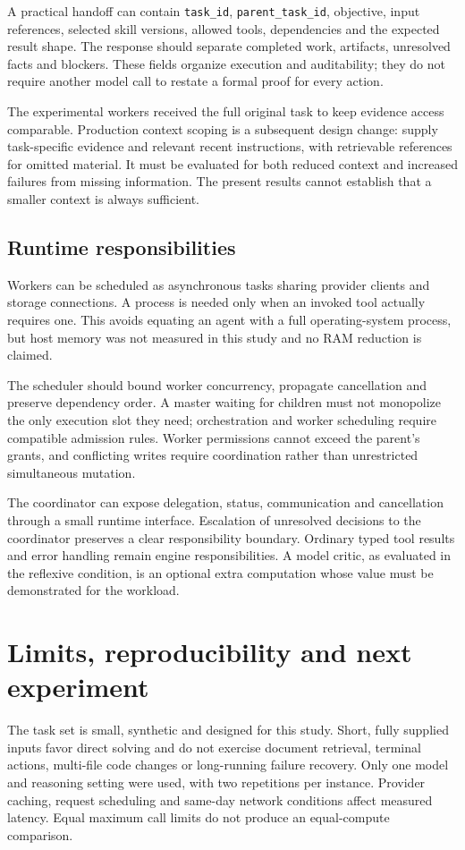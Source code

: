 A practical handoff can contain \texttt{task\_id}, \texttt{parent\_task\_id}, objective, input references, selected skill versions, allowed tools, dependencies and the expected result shape. The response should separate completed work, artifacts, unresolved facts and blockers. These fields organize execution and auditability; they do not require another model call to restate a formal proof for every action.

The experimental workers received the full original task to keep evidence access comparable. Production context scoping is a subsequent design change: supply task-specific evidence and relevant recent instructions, with retrievable references for omitted material. It must be evaluated for both reduced context and increased failures from missing information. The present results cannot establish that a smaller context is always sufficient.

\subsection{Runtime responsibilities}
Workers can be scheduled as asynchronous tasks sharing provider clients and storage connections. A process is needed only when an invoked tool actually requires one. This avoids equating an agent with a full operating-system process, but host memory was not measured in this study and no RAM reduction is claimed.

The scheduler should bound worker concurrency, propagate cancellation and preserve dependency order. A master waiting for children must not monopolize the only execution slot they need; orchestration and worker scheduling require compatible admission rules. Worker permissions cannot exceed the parent's grants, and conflicting writes require coordination rather than unrestricted simultaneous mutation.

The coordinator can expose delegation, status, communication and cancellation through a small runtime interface. Escalation of unresolved decisions to the coordinator preserves a clear responsibility boundary. Ordinary typed tool results and error handling remain engine responsibilities. A model critic, as evaluated in the reflexive condition, is an optional extra computation whose value must be demonstrated for the workload.

\section{Limits, reproducibility and next experiment}
The task set is small, synthetic and designed for this study. Short, fully supplied inputs favor direct solving and do not exercise document retrieval, terminal actions, multi-file code changes or long-running failure recovery. Only one model and reasoning setting were used, with two repetitions per instance. Provider caching, request scheduling and same-day network conditions affect measured latency. Equal maximum call limits do not produce an equal-compute comparison.

